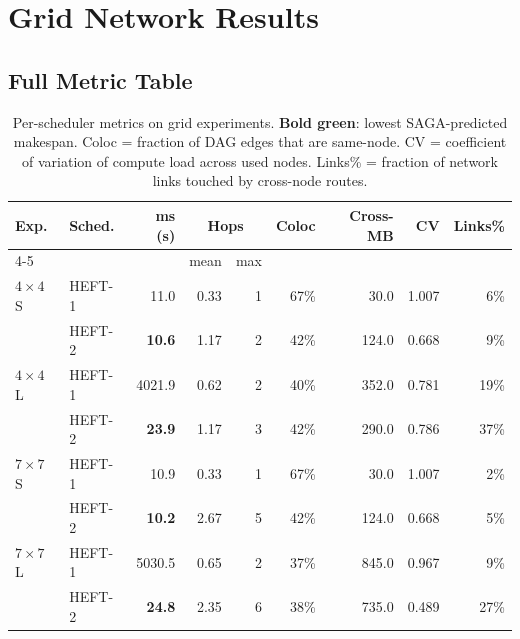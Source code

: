 \documentclass[11pt]{article}
\newcommand{\win}[1]{\textcolor{green!50!black}{\textbf{#1}}}
\begin{document}
\section{Grid Network Results}

\subsection{Full Metric Table}

\begin{table}[H]
\centering
\small
\setlength{\tabcolsep}{3.5pt}
\begin{tabular}{l l r r@{\,}r r r r r}
\toprule
\textbf{Exp.} & \textbf{Sched.}
  & \textbf{ms (s)} & \multicolumn{2}{c}{\textbf{Hops}}
  & \textbf{Coloc} & \textbf{Cross-MB}
  & \textbf{CV} & \textbf{Links\%} \\
\cmidrule(lr){4-5}
 &  &  & mean & max &  &  &  & \\
\midrule
  $4\times4$ S & HEFT-1 & 11.0 & 0.33 & 1 & 67\% & 30.0 & 1.007 & 6\% \\
   & HEFT-2 & \win{10.6} & 1.17 & 2 & 42\% & 124.0 & 0.668 & 9\% \\
  \midrule
  $4\times4$ L & HEFT-1 & 4021.9 & 0.62 & 2 & 40\% & 352.0 & 0.781 & 19\% \\
   & HEFT-2 & \win{23.9} & 1.17 & 3 & 42\% & 290.0 & 0.786 & 37\% \\
  \midrule
  $7\times7$ S & HEFT-1 & 10.9 & 0.33 & 1 & 67\% & 30.0 & 1.007 & 2\% \\
   & HEFT-2 & \win{10.2} & 2.67 & 5 & 42\% & 124.0 & 0.668 & 5\% \\
  \midrule
  $7\times7$ L & HEFT-1 & 5030.5 & 0.65 & 2 & 37\% & 845.0 & 0.967 & 9\% \\
   & HEFT-2 & \win{24.8} & 2.35 & 6 & 38\% & 735.0 & 0.489 & 27\% \\
  \bottomrule
\end{tabular}
\caption{Per-scheduler metrics on grid experiments.
\win{Bold green}: lowest SAGA-predicted makespan.
Coloc = fraction of DAG edges that are same-node.
CV = coefficient of variation of compute load across used nodes.
Links\% = fraction of network links touched by cross-node routes.}
\end{table}
\end{document}
